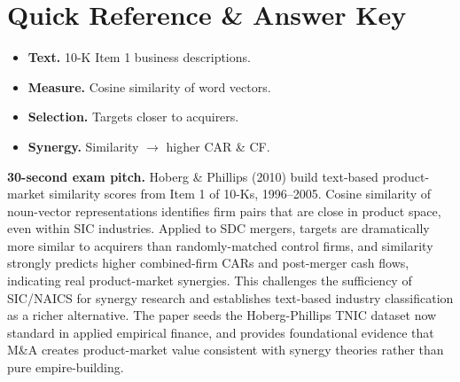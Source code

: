 \documentclass[11pt]{article}
\begin{document}
\section*{Quick Reference \& Answer Key}
\begin{answerbox}
\begin{itemize}
\item \textbf{Text.} 10-K Item 1 business descriptions.
\item \textbf{Measure.} Cosine similarity of word vectors.
\item \textbf{Selection.} Targets closer to acquirers.
\item \textbf{Synergy.} Similarity $\to$ higher CAR \& CF.
\end{itemize}
\end{answerbox}

\begin{keybox}
\textbf{30-second exam pitch.} Hoberg \& Phillips (2010) build text-based product-market similarity scores from Item 1 of 10-Ks, 1996--2005. Cosine similarity of noun-vector representations identifies firm pairs that are close in product space, even within SIC industries. Applied to SDC mergers, targets are dramatically more similar to acquirers than randomly-matched control firms, and similarity strongly predicts higher combined-firm CARs and post-merger cash flows, indicating real product-market synergies. This challenges the sufficiency of SIC/NAICS for synergy research and establishes text-based industry classification as a richer alternative. The paper seeds the Hoberg-Phillips TNIC dataset now standard in applied empirical finance, and provides foundational evidence that M\&A creates product-market value consistent with synergy theories rather than pure empire-building.
\end{keybox}
\end{document}
